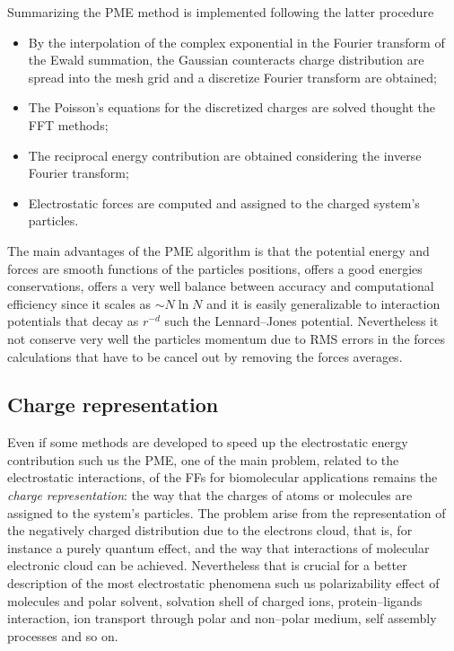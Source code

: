 Summarizing the \ac{PME} method is implemented following the latter procedure
\begin{itemize}
	\item By the interpolation of the complex exponential in the Fourier transform of the Ewald summation, the Gaussian counteracts charge distribution are spread into the mesh grid and a discretize Fourier transform are obtained;
	\item The Poisson's equations for the discretized charges are solved thought the \ac{FFT} methods;
	\item The reciprocal energy contribution are obtained considering the inverse Fourier transform; 
	\item Electrostatic forces are computed and assigned to the charged system's particles.
\end{itemize}
The main advantages of the \ac{PME} algorithm is that the potential energy and forces are smooth functions of the particles positions, offers a good energies conservations, offers a very well balance between accuracy and computational efficiency since it scales as $\sim N\ln N$ and it is easily generalizable to interaction potentials that decay as $r^{-d}$ such the Lennard--Jones potential. Nevertheless it not conserve very well the particles momentum due to \ac{RMS} errors in the forces calculations that have to be cancel out by removing the forces averages. 

\subsection{Charge representation}
\label{sec:chargeRep}
Even if some methods are developed to speed up the electrostatic energy contribution such us the \ac{PME}, one of the main problem, related to the electrostatic interactions, of the \acp{FF} for biomolecular applications remains the \textit{charge representation}: the way that the charges of atoms or molecules are assigned to the system's particles. The problem arise from the representation of the negatively charged distribution due to the electrons cloud, that is, for instance a purely quantum effect, and the way that interactions of molecular electronic cloud can be achieved. Nevertheless that is crucial for a better description of the most electrostatic phenomena such us polarizability effect of molecules and polar solvent, solvation shell of charged ions, protein--ligands interaction, ion transport through polar and non--polar medium, self assembly processes and so on.

